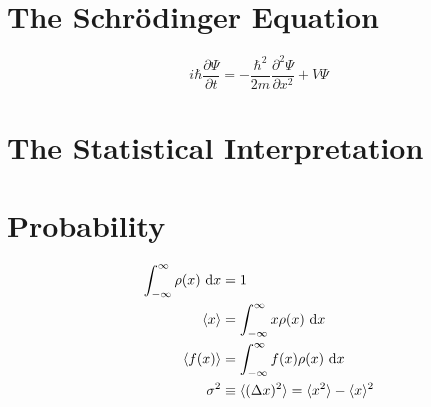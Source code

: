 \documentclass[en, oneside]{vivi}
\begin{document}
\section{The Schrödinger Equation}
\begin{equation}
    i\hbar\frac{\partial \Psi}{\partial t} = -\frac{\hbar^2}{2m}\frac{\partial^2 \Psi}{\partial x^2} + V\Psi
\end{equation}
\section{The Statistical Interpretation}

\section{Probability}
\begin{align}
    \int_{-\infty}^{\infty}\rho(x) \dif x &= 1\\
    \langle x \rangle &= \int_{-\infty}^{\infty}x\rho(x) \dif x\\
    \langle f(x) \rangle &= \int_{-\infty}^{\infty}f(x)\rho(x) \dif x\\
    \sigma ^2 &\equiv \langle (\Delta x)^2 \rangle = \langle x^2 \rangle - \langle x \rangle^2
\end{align}
\end{document}
